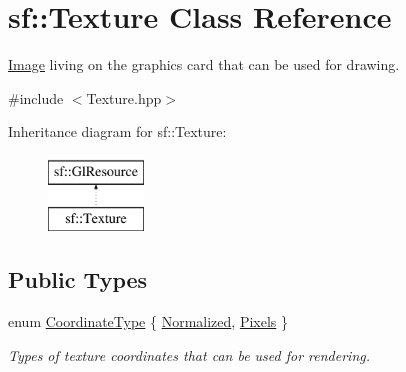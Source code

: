 \hypertarget{classsf_1_1_texture}{}\section{sf\+:\+:Texture Class Reference}
\label{classsf_1_1_texture}


\mbox{\hyperlink{classsf_1_1_image}{Image}} living on the graphics card that can be used for drawing.  




{\ttfamily \#include $<$Texture.\+hpp$>$}

Inheritance diagram for sf\+:\+:Texture\+:\begin{figure}[H]
\begin{center}
\leavevmode
\includegraphics[height=2.000000cm]{classsf_1_1_texture}
\end{center}
\end{figure}
\subsection*{Public Types}
\begin{DoxyCompactItemize}
\item 
enum \mbox{\hyperlink{classsf_1_1_texture_aa6fd3bbe3c334b3c4428edfb2765a82e}{Coordinate\+Type}} \{ \mbox{\hyperlink{classsf_1_1_texture_aa6fd3bbe3c334b3c4428edfb2765a82ea69d6228950882e4d68be4ba4dbe7df73}{Normalized}}, 
\mbox{\hyperlink{classsf_1_1_texture_aa6fd3bbe3c334b3c4428edfb2765a82ea6372f9c3a10203a7a69d8d5da59d82ff}{Pixels}}
 \}
\begin{DoxyCompactList}\small\item\em Types of texture coordinates that can be used for rendering. \end{DoxyCompactList}\end{DoxyCompactItemize}
